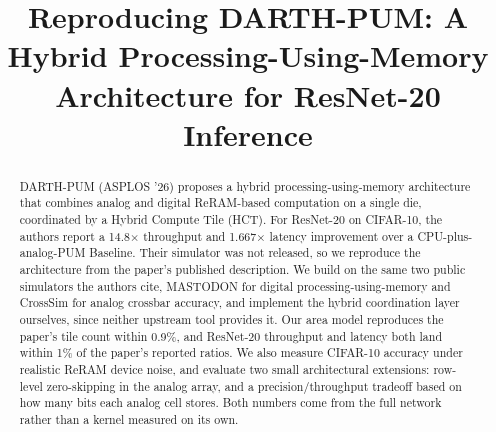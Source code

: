 \documentclass[conference]{IEEEtran}
\begin{document}
\title{Reproducing DARTH-PUM: A Hybrid Processing-Using-Memory Architecture for ResNet-20 Inference}

\author{
\and
{}
\and
{}
\and
{}
}

\maketitle

\begin{abstract}
DARTH-PUM (ASPLOS '26) proposes a hybrid processing-using-memory
architecture that combines analog and digital ReRAM-based computation on a
single die, coordinated by a Hybrid Compute Tile (HCT). For ResNet-20 on
CIFAR-10, the authors report a 14.8$\times$ throughput and 1.667$\times$
latency improvement over a CPU-plus-analog-PUM Baseline. Their simulator was
not released, so we reproduce the architecture from the paper's published
description. We build on the same two public simulators the authors cite,
MASTODON for digital processing-using-memory and CrossSim for analog
crossbar accuracy, and implement the hybrid coordination layer ourselves,
since neither upstream tool provides it. Our area model reproduces the
paper's tile count within 0.9\%, and ResNet-20 throughput and latency both
land within 1\% of the paper's reported ratios. We also measure CIFAR-10
accuracy under realistic ReRAM device noise, and evaluate two small
architectural extensions: row-level zero-skipping in the analog array, and
a precision/throughput tradeoff based on how many bits each analog cell
stores. Both numbers come from the full network rather than a kernel
measured on its own.
\end{abstract}
\end{document}
